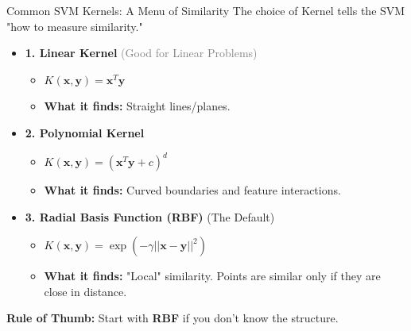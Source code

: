 \begin{frame}{Common SVM Kernels: A Menu of Similarity}
    The choice of Kernel tells the SVM "how to measure similarity."
    
    \vspace{0.5em}
    \begin{itemize}
        \item \textbf{1. Linear Kernel} \hfill \textcolor{gray}{\small (Good for Linear Problems)}
        \begin{itemize}
            \item \small $K(\mathbf{x}, \mathbf{y}) = \mathbf{x}^T \mathbf{y}$
            \item \textbf{What it finds:} Straight lines/planes. 
        \end{itemize}
        \vspace{0.2em}

        \item \textbf{2. Polynomial Kernel} \hfill \textcolor{gray}{}
        \begin{itemize}
            \item \small $K(\mathbf{x}, \mathbf{y}) = (\mathbf{x}^T \mathbf{y} + c)^d$
            \item \textbf{What it finds:} Curved boundaries and feature interactions.
        \end{itemize}
        \vspace{0.2em}

        \item \textbf{3. Radial Basis Function (RBF)} \hfill \textcolor{myblue}{\small (The Default)}
        \begin{itemize}
            \item \small $K(\mathbf{x}, \mathbf{y}) = \exp(-\gamma ||\mathbf{x} - \mathbf{y}||^2)$
            \item \textbf{What it finds:} "Local" similarity. Points are similar only if they are close in distance.
        \end{itemize}
    \end{itemize}

    \begin{tcolorbox}[colback=green!5, colframe=green!50!black, boxsep=2pt, left=4pt]
        \textbf{Rule of Thumb:} Start with \textbf{RBF} if you don't know the structure. 
    \end{tcolorbox}
\end{frame}

